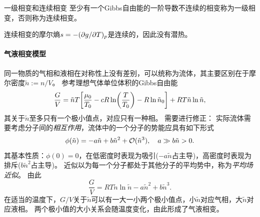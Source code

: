 \begin{definition}
	{一级相变和连续相变}{}
	至少有一个Gibbs自由能的一阶导数不连续的相变称为一级相变，否则称为连续相变。
\end{definition}

\begin{corollary}
	连续相变的摩尔熵$s=-(\partial g/\partial T)_p$是连续的，因此没有潜热。
\end{corollary}

\paragraph{气液相变模型}

同一物质的气相和液相在对称性上没有差别，可以统称为流体，其主要区别在于摩尔密度$\tilde n:=n/V$。
参考理想气体单位体积的Gibbs自由能
\begin{equation}
	\frac GV=\tilde nT\biggl[\frac{\mu_0}{T_0}-cR\ln\biggl(\frac T{T_0}\biggr)-R\ln\tilde n_0\biggr]+RT\tilde n\ln\tilde n,
\end{equation}
其关于$\tilde n$至多只有一个极小值点，对应只有一种相。
需要进行修正：
实际流体需要考虑分子间的\textit{相互作用}，流体中的一个分子的势能应具有如下形式
\[
	\phi(\tilde n)=-a\tilde n+b\tilde n^2+\mathcal O(\tilde n^3),\quad a\gg b\tilde n>0.
\]
其基本性质：$\phi(0)=0$，在低密度时表现为吸引($-a\tilde n$占主导)，高密度时表现为排斥($b\tilde n^2$占主导)。
近似以为每一个分子都处于其他分子的平均势中，称为\textit{平均场近似}。
由此
\[
	\frac GV=RT\tilde n\ln \tilde n-a\tilde n^2+b\tilde n^3.
\]
在适当的温度下，$G/V$关于$\tilde n$可以有一大一小两个极小值点，小$\tilde n$对应气相，大$\tilde n$对应液相。
两个极小值的大小关系会随温度变化，由此形成了气液相变。


